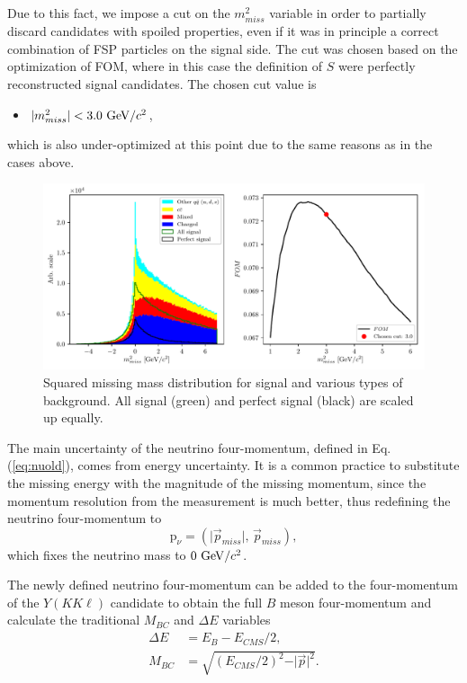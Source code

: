 Due to this fact, we impose a cut on the $m_{miss}^2$ variable in order to partially discard candidates with spoiled properties, even if it was in principle a correct combination of FSP particles on the signal side. The cut was chosen based on the optimization of FOM, where in this case the definition of $S$ were perfectly reconstructed signal candidates. The chosen cut value is 
\begin{itemize}
	\item $\vert m_{miss}^2 \vert < 3.0\mathrm{~GeV}/c^2$,
\end{itemize}
which is also under-optimized at this point due to the same reasons as in the cases above.


\begin{figure}[H]
	\centering
	\captionsetup{width=.8\linewidth}
	\includegraphics[width=\linewidth]{fig/missM2}
	\caption{Squared missing mass distribution for signal and various types of background. All signal (green) and perfect signal (black) are scaled up equally.}
	\label{fig:missm2}
\end{figure}

The main uncertainty of the neutrino four-momentum, defined in Eq. (\ref{eq:nuold}), comes from energy uncertainty. It is a common practice to substitute the missing energy with the magnitude of the missing momentum, since the momentum resolution from the measurement is much better, thus redefining the neutrino four-momentum to
\begin{equation}
\label{eq:nunew}
\mathrm{p}_\nu = \left(\vert \vec{p}_{miss} \vert,\,\vec{p}_{miss} \right),
\end{equation}
which fixes the neutrino mass to $0\mathrm{~GeV}/c^2$.

The newly defined neutrino four-momentum can be added to the four-momentum of the $Y(KK\ell)$ candidate to obtain the full $B$ meson four-momentum and calculate the traditional $M_{BC}$ and $\Delta E$ variables
\begin{align}
\label{eq:de}
\Delta E &= E_B - E_{CMS}/2,\\
M_{BC} &= \sqrt{\left(E_{CMS}/2\right)^2 - \vert \vec{p} \vert^2}.
\end{align}

